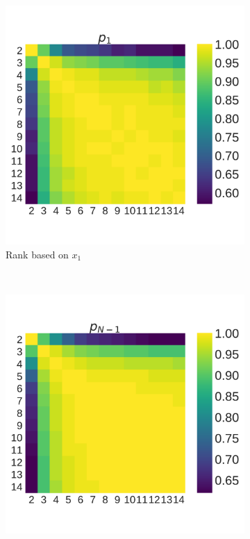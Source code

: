 \documentclass[10pt,journal]{IEEEtran}
\begin{document}
\begin{figure}[!htbp]
    \centering
    \begin{subfigure}[t]{.3\columnwidth}
        \centering
        \includegraphics[width=\columnwidth]{img/correlation_heatmap_invade.pdf}
        \caption{Rank based on \(x_1\)}
    \end{subfigure}
    ~
    \begin{subfigure}[t]{.3\columnwidth}
        \centering
        \includegraphics[width=\columnwidth]{img/correlation_heatmap_resist.pdf}

\end{subfigure}
\end{figure}
\end{document}
